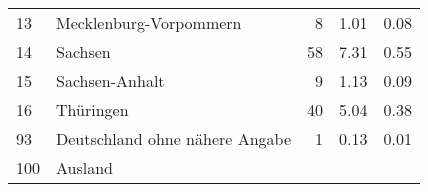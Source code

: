 \begin{longtable}{lXrrr}
     13 &
     \multicolumn{1}{X}{ Mecklenburg-Vorpommern   } &


       \num{8} &
       \num[round-mode=places,round-precision=2]{1,01} &
         \num[round-mode=places,round-precision=2]{0,08} \\

     14 &
     \multicolumn{1}{X}{ Sachsen   } &


       \num{58} &
       \num[round-mode=places,round-precision=2]{7,31} &
         \num[round-mode=places,round-precision=2]{0,55} \\

     15 &
     \multicolumn{1}{X}{ Sachsen-Anhalt   } &


       \num{9} &
       \num[round-mode=places,round-precision=2]{1,13} &
         \num[round-mode=places,round-precision=2]{0,09} \\

     16 &
     \multicolumn{1}{X}{ Thüringen   } &


       \num{40} &
       \num[round-mode=places,round-precision=2]{5,04} &
         \num[round-mode=places,round-precision=2]{0,38} \\

     93 &
     \multicolumn{1}{X}{ Deutschland ohne nähere Angabe   } &


       \num{1} &
       \num[round-mode=places,round-precision=2]{0,13} &
         \num[round-mode=places,round-precision=2]{0,01} \\

     100 &
     \multicolumn{1}{X}{ Ausland   } &



\end{longtable}
